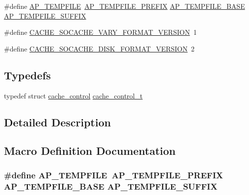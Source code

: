 \begin{DoxyCompactItemize}
\item 
\#define \hyperlink{group__Cache__cache_gac5d09eab58226cc659771751cb32f62a}{A\+P\+\_\+\+T\+E\+M\+P\+F\+I\+LE}~\hyperlink{group__Cache__cache_ga609fdfa445244cd79c5e16f729dc6e4c}{A\+P\+\_\+\+T\+E\+M\+P\+F\+I\+L\+E\+\_\+\+P\+R\+E\+F\+IX} \hyperlink{group__Cache__cache_ga12620840f8efdfebfc661efeceb9f279}{A\+P\+\_\+\+T\+E\+M\+P\+F\+I\+L\+E\+\_\+\+B\+A\+SE} \hyperlink{group__Cache__cache_gaedd8e0eae5a66168309188af5c51dee2}{A\+P\+\_\+\+T\+E\+M\+P\+F\+I\+L\+E\+\_\+\+S\+U\+F\+F\+IX}
\item 
\#define \hyperlink{group__Cache__cache_ga4b9720b6be38ee12f2fbaa81990a8bf7}{C\+A\+C\+H\+E\+\_\+\+S\+O\+C\+A\+C\+H\+E\+\_\+\+V\+A\+R\+Y\+\_\+\+F\+O\+R\+M\+A\+T\+\_\+\+V\+E\+R\+S\+I\+ON}~1
\item 
\#define \hyperlink{group__Cache__cache_gaf6e91997dc4285f1464ba274687657f8}{C\+A\+C\+H\+E\+\_\+\+S\+O\+C\+A\+C\+H\+E\+\_\+\+D\+I\+S\+K\+\_\+\+F\+O\+R\+M\+A\+T\+\_\+\+V\+E\+R\+S\+I\+ON}~2
\end{DoxyCompactItemize}
\subsection*{Typedefs}
\begin{DoxyCompactItemize}
\item 
typedef struct \hyperlink{structcache__control}{cache\+\_\+control} \hyperlink{group__Cache__cache_ga974ed8fda97372a8db4010093bf933c2}{cache\+\_\+control\+\_\+t}
\end{DoxyCompactItemize}


\subsection{Detailed Description}


\subsection{Macro Definition Documentation}
\subsubsection[{\texorpdfstring{A\+P\+\_\+\+T\+E\+M\+P\+F\+I\+LE}{AP_TEMPFILE}}]{\setlength{\rightskip}{0pt plus 5cm}\#define A\+P\+\_\+\+T\+E\+M\+P\+F\+I\+LE~{\bf A\+P\+\_\+\+T\+E\+M\+P\+F\+I\+L\+E\+\_\+\+P\+R\+E\+F\+IX} {\bf A\+P\+\_\+\+T\+E\+M\+P\+F\+I\+L\+E\+\_\+\+B\+A\+SE} {\bf A\+P\+\_\+\+T\+E\+M\+P\+F\+I\+L\+E\+\_\+\+S\+U\+F\+F\+IX}}\hypertarget{group__Cache__cache_gac5d09eab58226cc659771751cb32f62a}{}\label{group__Cache__cache_gac5d09eab58226cc659771751cb32f62a}
